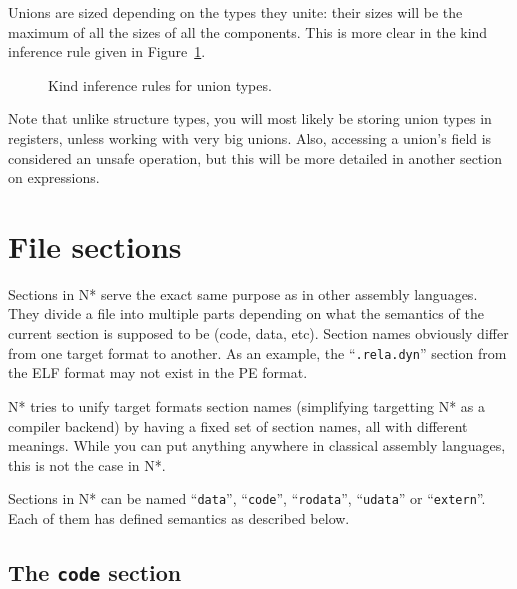 Unions are sized depending on the types they unite: their sizes will be the maximum of all the sizes of all the components.
This is more clear in the kind inference rule given in Figure~\ref{fig:nstar-common-ts-unions-kindrules}.

\begin{figure}[htb]
  \centering

  \begin{prooftree}
  \end{prooftree}

  \caption{Kind inference rules for union types.}
  \label{fig:nstar-common-ts-unions-kindrules}
\end{figure}

Note that unlike structure types, you will most likely be storing union types in registers, unless working with very big unions.
Also, accessing a union's field is considered an unsafe operation, but this will be more detailed in another section on expressions.

\section{File sections}\label{sec:nstar-common-sections}

Sections in N* serve the exact same purpose as in other assembly languages. They divide a file into multiple parts depending on what the semantics of the current section is supposed to be (code, data, etc).
Section names obviously differ from one target format to another. As an example, the ``\texttt{.rela.dyn}'' section from the ELF format may not exist in the PE format.

N* tries to unify target formats section names (simplifying targetting N* as a compiler backend) by having a fixed set of section names, all with different meanings. While you can put anything anywhere in classical assembly languages, this is not the case in N*.

Sections in N* can be named ``\texttt{data}'', ``\texttt{code}'', ``\texttt{rodata}'', ``\texttt{udata}'' or ``\texttt{extern}''. Each of them has defined semantics as described below.

\subsection{The \texttt{code} section}\label{subsec:nstar-common-sections-code}

